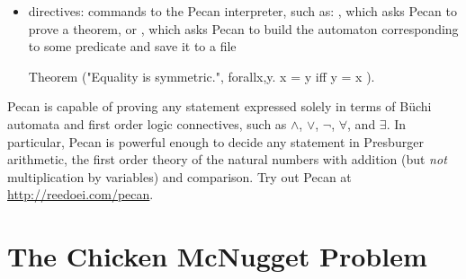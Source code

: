 \documentclass[landscape,usenames,dvipsnames]{sciposter}
\newtheorem*{ex}{Example}
\begin{document}
\begin{multicols}{3}
\begin{itemize}
    \item directives: commands to the Pecan interpreter, such as: , which asks Pecan to prove a theorem, or , which asks Pecan to build the automaton corresponding to some predicate and save it to a file

\begin{pecan}
Theorem ("Equality is symmetric.", { forallx,y. x = y iff y = x }).
\end{pecan}

\end{itemize}






Pecan is capable of proving any statement expressed solely in terms of B\"uchi automata and first order logic connectives, such as $\wedge$, $\vee$, $\neg$, $\forall$, and $\exists$.
In particular, Pecan is powerful enough to decide any statement in Presburger arithmetic, the first order theory of the natural numbers with addition (but \emph{not} multiplication by variables) and comparison.
Try out Pecan at \url{http://reedoei.com/pecan}.

\section*{The Chicken McNugget Problem}


\end{multicols}
\end{document}
